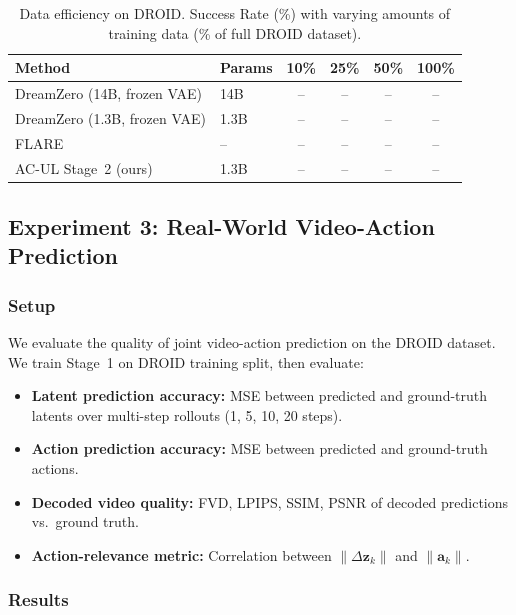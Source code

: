 \documentclass{article}
\newcommand{\vz}{\bm{z}}
\newcommand{\va}{\bm{a}}
\begin{document}
\begin{table}[t]
\centering
\caption{Data efficiency on DROID. Success Rate (\%) with varying amounts of training data (\% of full DROID dataset).}
\label{tab:data_efficiency}
\begin{tabular}{llcccc}
\toprule
\textbf{Method} & \textbf{Params} & \textbf{10\%} & \textbf{25\%} & \textbf{50\%} & \textbf{100\%} \\
\midrule
DreamZero (14B, frozen VAE)   & 14B  & -- & -- & -- & -- \\
DreamZero (1.3B, frozen VAE)  & 1.3B & -- & -- & -- & -- \\
FLARE                         & --   & -- & -- & -- & -- \\
\midrule
AC-UL Stage~2 (ours)          & 1.3B & -- & -- & -- & -- \\
\bottomrule
\end{tabular}
\end{table}

\subsection{Experiment 3: Real-World Video-Action Prediction}
\label{sec:exp_video}

\subsubsection{Setup}

We evaluate the quality of joint video-action prediction on the DROID dataset. We train Stage~1 on DROID training split, then evaluate:
\begin{itemize}[leftmargin=*,itemsep=2pt]
  \item \textbf{Latent prediction accuracy:} MSE between predicted and ground-truth latents over multi-step rollouts (1, 5, 10, 20 steps).
  \item \textbf{Action prediction accuracy:} MSE between predicted and ground-truth actions.
  \item \textbf{Decoded video quality:} FVD, LPIPS, SSIM, PSNR of decoded predictions vs.\ ground truth.
  \item \textbf{Action-relevance metric:} Correlation between $\|\Delta \vz_k\|$ and $\|\va_k\|$.
\end{itemize}

\subsubsection{Results}
\end{document}
